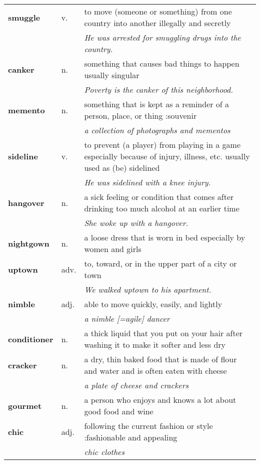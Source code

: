 \documentclass[a4paper]{article}
\begin{document}
\begin{longtable}{llp{12cm}}
\textbf{smuggle} & v. &  to move (someone or something) from one country into another illegally and secretly \\
 & & \textit{He was arrested for smuggling drugs into the country.}\\[0.08cm]
\textbf{canker} & n. &  something that causes bad things to happen usually singular \\
 & & \textit{Poverty is the canker of this neighborhood.}\\[0.08cm]
\textbf{memento} & n. &  something that is kept as a reminder of a person, place, or thing :souvenir \\
 & & \textit{a collection of photographs and mementos}\\[0.08cm]
\textbf{sideline} & v. &  to prevent (a player) from playing in a game especially because of injury, illness, etc. usually used as (be) sidelined \\
 & & \textit{He was sidelined with a knee injury.}\\[0.08cm]
\textbf{hangover} & n. &  a sick feeling or condition that comes after drinking too much alcohol at an earlier time \\
 & & \textit{She woke up with a hangover.}\\[0.08cm]
\textbf{nightgown} & n. &  a loose dress that is worn in bed especially by women and girls \\[0.08cm]
\textbf{uptown} & adv. &  to, toward, or in the upper part of a city or town \\
 & & \textit{We walked uptown to his apartment.}\\[0.08cm]
\textbf{nimble} & adj. &  able to move quickly, easily, and lightly \\
 & & \textit{a nimble [=agile] dancer}\\[0.08cm]
\textbf{conditioner} & n. &  a thick liquid that you put on your hair after washing it to make it softer and less dry\\[0.08cm]
\textbf{cracker} & n. &  a dry, thin baked food that is made of flour and water and is often eaten with cheese \\
 & & \textit{a plate of cheese and crackers}\\[0.08cm]
\textbf{gourmet} & n. &  a person who enjoys and knows a lot about good food and wine\\[0.08cm]
\textbf{chic} & adj. &  following the current fashion or style :fashionable and appealing \\
 & & \textit{chic clothes}\\[0.08cm]

\end{longtable}
\end{document}
